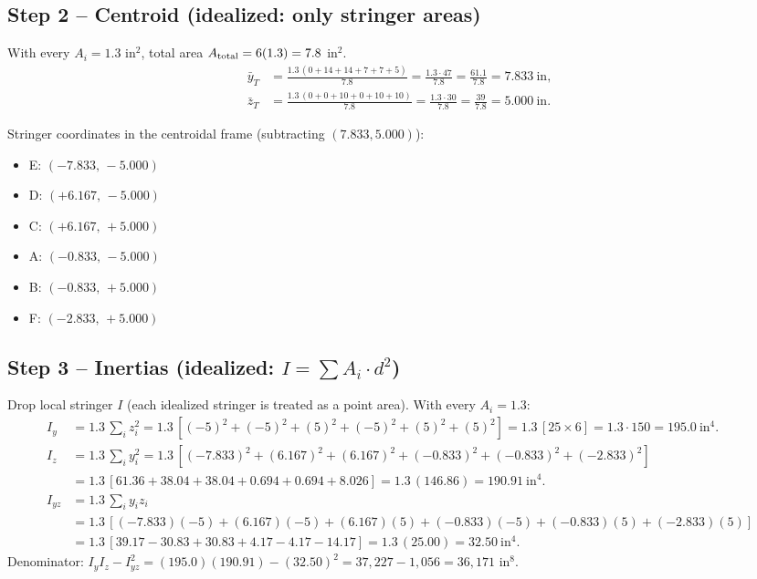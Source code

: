 \documentclass[11pt]{article}
\begin{document}
\subsection*{Step 2 -- Centroid (idealized: only stringer areas)}

With every $A_i = 1.3$ in$^2$, total area $A_{\rm total} = 6(1.3) = 7.8$ in$^2$.
\begin{align*}
\bar y_T &= \frac{1.3\,(0 + 14 + 14 + 7 + 7 + 5)}{7.8} = \frac{1.3 \cdot 47}{7.8} = \frac{61.1}{7.8} = 7.833\ \text{in},\\
\bar z_T &= \frac{1.3\,(0 + 0 + 10 + 0 + 10 + 10)}{7.8} = \frac{1.3 \cdot 30}{7.8} = \frac{39}{7.8} = 5.000\ \text{in}.
\end{align*}

Stringer coordinates in the centroidal frame (subtracting $(7.833, 5.000)$):
\begin{itemize}[leftmargin=2em, itemsep=0pt]
  \item E: $(-7.833,\, -5.000)$
  \item D: $(+6.167,\, -5.000)$
  \item C: $(+6.167,\, +5.000)$
  \item A: $(-0.833,\, -5.000)$
  \item B: $(-0.833,\, +5.000)$
  \item F: $(-2.833,\, +5.000)$
\end{itemize}

\subsection*{Step 3 -- Inertias (idealized: $I = \sum A_i \cdot d^2$)}

Drop local stringer $I$ (each idealized stringer is treated as a point area). With every $A_i = 1.3$:
\begin{align*}
I_y &= 1.3\,\sum_i z_i^2 = 1.3\,[(-5)^2 + (-5)^2 + (5)^2 + (-5)^2 + (5)^2 + (5)^2] = 1.3\,[25 \times 6] = 1.3 \cdot 150 = 195.0\ \text{in}^4.\\
I_z &= 1.3\,\sum_i y_i^2 = 1.3\,[(-7.833)^2 + (6.167)^2 + (6.167)^2 + (-0.833)^2 + (-0.833)^2 + (-2.833)^2]\\
&= 1.3\,[61.36 + 38.04 + 38.04 + 0.694 + 0.694 + 8.026] = 1.3\,(146.86) = 190.91\ \text{in}^4.\\
I_{yz} &= 1.3\,\sum_i y_i z_i\\
&= 1.3\,[(-7.833)(-5) + (6.167)(-5) + (6.167)(5) + (-0.833)(-5) + (-0.833)(5) + (-2.833)(5)]\\
&= 1.3\,[39.17 - 30.83 + 30.83 + 4.17 - 4.17 - 14.17] = 1.3\,(25.00) = 32.50\ \text{in}^4.
\end{align*}
Denominator: $I_y I_z - I_{yz}^2 = (195.0)(190.91) - (32.50)^2 = 37{,}227 - 1{,}056 = 36{,}171$ in$^8$.
\end{document}
